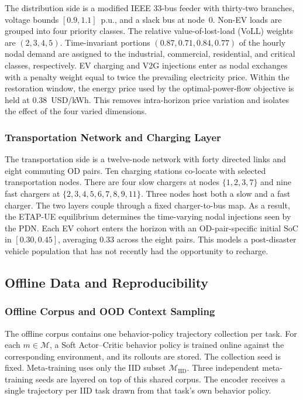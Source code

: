 The distribution side is a modified IEEE 33-bus feeder with thirty-two branches, voltage bounds $[0.9,1.1]$~p.u., and a slack bus at node~$0$. Non-EV loads are grouped into four priority classes. The relative value-of-lost-load (VoLL) weights are $(2,3,4,5)$. Time-invariant portions $(0.87, 0.71, 0.84, 0.77)$ of the hourly nodal demand are assigned to the industrial, commercial, residential, and critical classes, respectively. EV charging and V2G injections enter as nodal exchanges with a penalty weight equal to twice the prevailing electricity price. Within the restoration window, the energy price used by the optimal-power-flow objective is held at $0.38$~USD/kWh. This removes intra-horizon price variation and isolates the effect of the four varied dimensions.

\subsubsection{Transportation Network and Charging Layer}
\label{app:tn_system}

The transportation side is a twelve-node network with forty directed links and eight commuting OD pairs. Ten charging stations co-locate with selected transportation nodes. There are four slow chargers at nodes $\{1,2,3,7\}$ and nine fast chargers at $\{2,3,4,5,6,7,8,9,11\}$. Three nodes host both a slow and a fast charger. The two layers couple through a fixed charger-to-bus map. As a result, the ETAP-UE equilibrium determines the time-varying nodal injections seen by the PDN. Each EV cohort enters the horizon with an OD-pair-specific initial SoC in $[0.30, 0.45]$, averaging $0.33$ across the eight pairs. This models a post-disaster vehicle population that has not recently had the opportunity to recharge.

\subsection{Offline Data and Reproducibility}
\label{app:data_reproducibility}

\subsubsection{Offline Corpus and OOD Context Sampling}
\label{app:data}

The offline corpus contains one behavior-policy trajectory collection per task. For each $m\in\mathcal{M}$, a Soft Actor--Critic behavior policy is trained online against the corresponding environment, and its rollouts are stored. The collection seed is fixed. Meta-training uses only the IID subset $\mathcal{M}_{\text{IID}}$. Three independent meta-training seeds are layered on top of this shared corpus. The encoder receives a single trajectory per IID task drawn from that task's own behavior policy.

